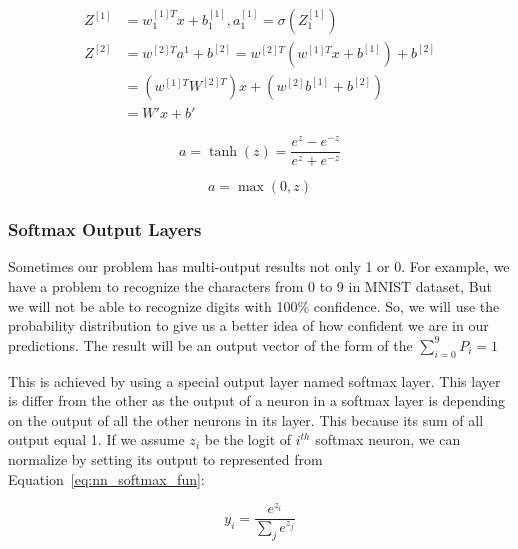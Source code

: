 

\begin{subequations}\label{eq_linear_fun_limitations}
   \begin{align}
     Z^{[1]} & = w_1^{[1]T} x + b_1^{[1]} , a_1^{[1]} = \sigma(Z_1^{[1]}) \\
     Z^{[2]} & = w^{[2]T} a^1 + b^{[2]} = w^{[2]T} (w^{[1]T}x + b^{[1]}) + b^{[2]}\\
             & = (w^{[1]T}W^{[2]T})x + (w^{[2]}b^{[1]}+ b^{[2]})\\
             & = W' x + b'
\end{align}
\end{subequations}



 
\begin{equation}\label{eq:nn_tanh}
  a = \tanh(z) =\frac{e^z-e^{-z}}{e^z+e^{-z}}
\end{equation}%



\begin{equation}\label{eq:nn_relu}
  a = \max(0,z)
\end{equation}%

\subsubsection{Softmax Output Layers}
Sometimes our problem has multi-output results not only 1 or 0. For example, we have a problem to recognize the characters from 0 to 9 in MNIST dataset, But we will not be able to recognize digits with 100\% confidence. So, we will use the probability distribution to give us a better idea of how confident we are in our predictions. The result will be an output vector of the form of the $\sum_{i = 0}^9P_i=1$

This is achieved by using a special output layer named softmax layer. This layer is differ from the other as the output of a neuron in a softmax layer is depending on the output of all the other neurons in its layer. This because its sum of all output equal 1. If we assume $z_i$ be the logit of $i^{th}$ softmax neuron, we can normalize by setting its output to represented from Equation~\eqref{eq:nn_softmax_fun}:

\begin{equation}\label{eq:nn_softmax_fun}
  y_i=\frac{e^{z_i}}{\sum_je^{z_j}}
\end{equation}

